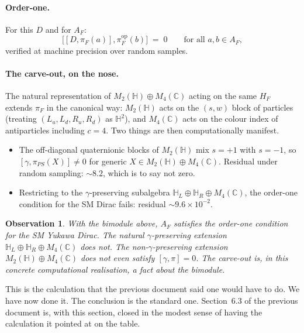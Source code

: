 \documentclass[11pt,a4paper]{article}
\newtheorem{observation}[theorem]{Observation}
\begin{document}
\paragraph{Order-one.}
For this $D$ and for $A_F$:
\[
  \big[\![ D, \pi_F(a) ], \pi_F^{\mathrm{op}}(b) \big]
  \;=\; 0
  \qquad \text{for all } a, b \in A_F,
\]
verified at machine precision over random samples.

\paragraph{The carve-out, on the nose.}
The natural representation of $M_2(\mathbb{H}) \oplus M_4(\mathbb{C})$ acting
on the same $H_F$ extends $\pi_F$ in the canonical way: $M_2(\mathbb{H})$ acts
on the $(s,w)$ block of particles (treating $(L_u, L_d, R_u, R_d)$ as
$\mathbb{H}^2$), and $M_4(\mathbb{C})$ acts on the colour index of
antiparticles including $c = 4$. Two things are then computationally manifest.
\begin{itemize}[leftmargin=2em]
  \item The off-diagonal quaternionic blocks of $M_2(\mathbb{H})$ mix $s = +1$
        with $s = -1$, so $[\gamma, \pi_{PS}(X)] \neq 0$ for generic
        $X \in M_2(\mathbb{H}) \oplus M_4(\mathbb{C})$. Residual under
        random sampling: $\sim 8.2$, which is to say not zero.
  \item Restricting to the $\gamma$-preserving subalgebra
        $\mathbb{H}_L \oplus \mathbb{H}_R \oplus M_4(\mathbb{C})$, the
        order-one condition for the SM Dirac fails:
        residual $\sim 9.6 \times 10^{-2}$.
\end{itemize}

\begin{observation}\label{obs:carveout}
With the bimodule above, $A_F$ satisfies the order-one condition for the SM
Yukawa Dirac. The natural $\gamma$-preserving extension
$\mathbb{H}_L \oplus \mathbb{H}_R \oplus M_4(\mathbb{C})$ does not. The
non-$\gamma$-preserving extension $M_2(\mathbb{H}) \oplus M_4(\mathbb{C})$ does
not even satisfy $[\gamma, \pi] = 0$. The carve-out is, in this concrete
computational realisation, a fact about the bimodule.
\end{observation}

This is the calculation that the previous document said one would have to do.
We have now done it. The conclusion is the standard one. Section~6.3 of the
previous document is, with this section, closed in the modest sense of having
the calculation it pointed at on the table.
\end{document}
